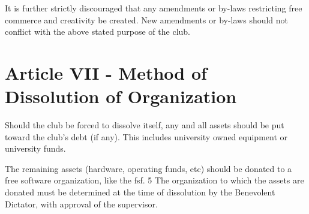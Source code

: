\documentclass{article}
\begin{document}
	It is further strictly discouraged that any amendments or by-laws restricting free commerce and creativity be created. New amendments or by-laws should not conflict with the above stated purpose of the club.

	\section{Article VII - Method of Dissolution of Organization}

	Should the club be forced to dissolve itself, any and all assets should be put toward the club's debt (if any). This includes university owned equipment or university funds.

	The remaining assets (hardware, operating funds, etc) should be donated to a free software organization, like the fsf. 5 The organization to which the assets are donated must be determined at the time of dissolution by the Benevolent Dictator, with approval of the supervisor.
\end{document}
